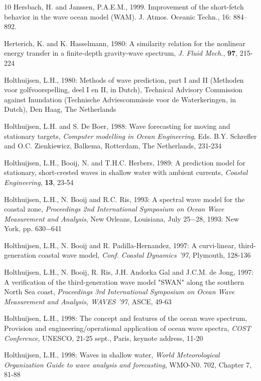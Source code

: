 \documentclass[12pt]{book}
\begin{document}
\begin{thebibliography}{10}
Hersbach, H. and Janssen, P.A.E.M., 1999. Improvement of the short-fetch behavior in the wave ocean
model ({WAM}). J. Atmos. Oceanic Techn., 16: 884--892.

Herterich, K. and K. Hasselmann, 1980: A similarity relation for the nonlinear energy transfer in a
finite-depth gravity-wave spectrum, {\it J. Fluid Mech.}, {\bf 97}, 215-224

Holthuijsen, L.H., 1980: Methods of wave prediction, part I and II (Methoden voor golfvoorspelling, deel I
en II, in Dutch), Technical Advisory Commission against Inundation (Technische
Adviescommissie voor de Waterkeringen, in Dutch), Den Haag, The Netherlands

Holthuijsen, L.H. and S. De Boer, 1988: Wave forecasting for moving and stationary targets, {\it Computer
modelling in Ocean Engineering}, Eds. B.Y. Schrefler and O.C. Zienkiewicz, Balkema, Rotterdam,
The Netherlands, 231-234

Holthuijsen, L.H., Booij, N. and T.H.C. Herbers, 1989: A prediction model for stationary, short-crested
waves in shallow water with ambient currents, {\it Coastal Engineering}, {\bf 13}, 23-54

Holthuijsen, L.H., N. Booij and R.C. Ris, 1993: A spectral wave model for the coastal zone, {\it Proceedings
2nd International Symposium on Ocean Wave Measurement and Analysis}, New Orleans,
Louisiana, July 25$-$28, 1993: New York, pp. 630$-$641

Holthuijsen, L.H., N. Booij and R. Padilla-Hernandez, 1997: A curvi-linear, third-generation coastal wave
model, {\it Conf. Coastal Dynamics '97}, Plymouth, 128-136

Holthuijsen, L.H., N. Booij, R. Ris, J.H. Andorka Gal and J.C.M. de Jong, 1997: A verification of the third-generation
wave model "SWAN" along the southern North Sea coast,  {\it Proceedings 3rd
International Symposium on Ocean Wave Measurement and Analysis, WAVES '97}, ASCE, 49-63

Holthuijsen, L.H., 1998: The concept and features of the ocean wave spectrum,
Provision and engineering/operational application of ocean wave spectra,
{\it COST Conference}, UNESCO, 21-25 sept., Paris, keynote address, 11-20

Holthuijsen, L.H., 1998: Waves in shallow water,
{\it World Meteorological Organization Guide to wave analysis and forecasting},
WMO-N0. 702, Chapter 7, 81-88


\end{thebibliography}
\end{document}
